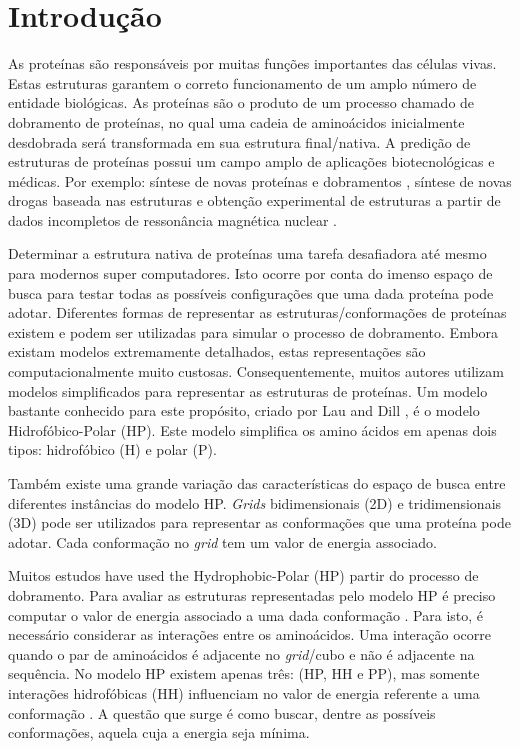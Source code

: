 \chapter{Introdução}

As proteínas são responsáveis por muitas funções importantes das células vivas. Estas estruturas garantem o correto funcionamento de um amplo número de entidade biológicas. As proteínas são o produto de um processo chamado de dobramento de proteínas, no qual uma cadeia de aminoácidos inicialmente desdobrada será transformada em sua estrutura final/nativa. A predição de estruturas de proteínas possui um campo amplo de aplicações biotecnológicas e médicas. Por exemplo: síntese de novas proteínas e dobramentos \cite{wang2012structural, rothlisberger2008kemp}, síntese de novas drogas baseada nas estruturas \cite{qian2004improvement, krieger2009improving}  e obtenção experimental de estruturas a partir de dados incompletos de ressonância magnética nuclear \cite{shen2009novo}.  

Determinar a estrutura nativa de proteínas uma tarefa desafiadora até mesmo para modernos super computadores. Isto ocorre por conta do imenso espaço de busca para testar todas as possíveis configurações que uma dada proteína pode adotar. Diferentes formas de representar as estruturas/conformações de proteínas existem e podem ser utilizadas para simular o processo de dobramento. Embora existam modelos extremamente detalhados, estas representações são computacionalmente muito custosas. Consequentemente, muitos autores \cite{custodio2004investigation,hsu2003growth,lin2011protein,unger1993genetic,santanna2008,custodio2014multiple, garza2012locality} utilizam modelos simplificados para representar as estruturas de proteínas. Um modelo bastante conhecido para este propósito, criado por Lau and Dill \cite{lau1989lattice}, é o modelo Hidrofóbico-Polar (HP). Este modelo simplifica os amino ácidos em apenas dois tipos: hidrofóbico (H) e polar (P). 



Também existe uma grande variação das características do espaço de busca entre diferentes instâncias do modelo HP. \textit{Grids} bidimensionais (2D) e tridimensionais (3D) pode ser utilizados para representar as conformações que uma proteína pode adotar. Cada conformação no \textit{grid} tem um valor de energia associado.

Muitos estudos  \cite{custodio2004investigation,hsu2003growth,lin2011protein,unger1993genetic,santana2008component,custodio2014multiple, garza2012locality} have used the Hydrophobic-Polar (HP) \cite{lau1989lattice}
 partir do processo de dobramento. Para avaliar as estruturas representadas pelo modelo HP é preciso computar o valor de energia associado a uma dada conformação \cite{unger1993genetic}. Para isto, é necessário considerar as interações entre os aminoácidos. Uma interação ocorre quando o par de aminoácidos é adjacente no \textit{grid}/cubo e não é adjacente na sequência. No modelo HP existem apenas três: (HP, HH e PP), mas somente interações hidrofóbicas (HH) influenciam no valor de energia referente a uma conformação \cite{unger1993genetic}. A questão que surge é como buscar, dentre as possíveis conformações, aquela cuja a energia seja mínima.
